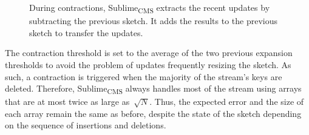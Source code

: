 \documentclass[sigconf]{acmart}
\newcommand{\sketch}{Sublime}
\newcommand{\sketchcms}{\sketch\textsubscript{CMS}\xspace}
\begin{document}
\begin{figure}
    \caption{During contractions, \sketchcms extracts the recent updates by
    subtracting the previous sketch. It adds the results to the previous sketch
    to transfer the updates.}
    \label{fig:contraction}
\end{figure}
\fi

The contraction threshold is set to the average of the two previous expansion
thresholds to avoid the problem of updates frequently resizing the sketch. As
such, a contraction is triggered when the majority of the stream's keys are
deleted. Therefore, \sketchcms always handles most of the stream using arrays
that are at most twice as large as~$\sqrt{N}$. Thus, the expected error and the
size of each array remain the same as before, despite the state of the sketch
depending on the sequence of insertions and deletions.
\end{document}
